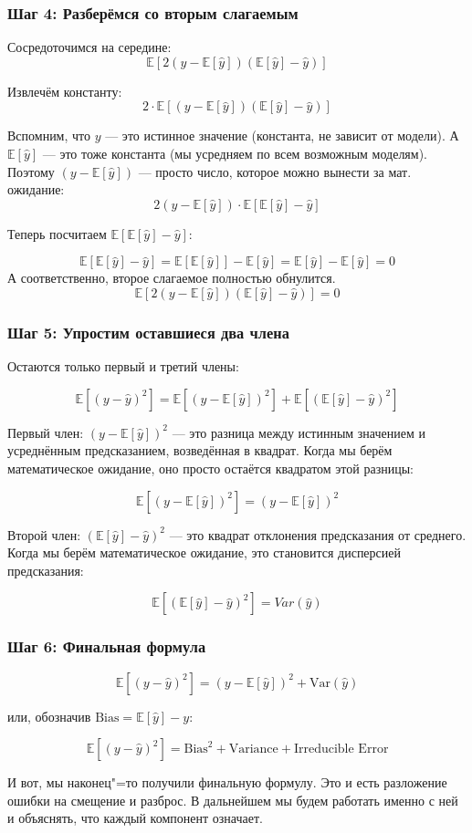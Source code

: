 \subsubsection*{Шаг 4: Разберёмся со вторым слагаемым}

Сосредоточимся на середине:
\[
\mathbb{E}[2(y - \mathbb{E}[\hat{y}])(\mathbb{E}[\hat{y}] - \hat{y})]
\]

Извлечём константу:
\[
2 \cdot \mathbb{E}[(y - \mathbb{E}[\hat{y}])(\mathbb{E}[\hat{y}] - \hat{y})]
\]

Вспомним, что $y$ --- это истинное значение (константа, не зависит от модели). А $\mathbb{E}[\hat{y}]$ --- это тоже константа (мы усредняем по всем возможным моделям). Поэтому $(y - \mathbb{E}[\hat{y}])$ --- просто число, которое можно вынести за мат. ожидание:
\[
2(y - \mathbb{E}[\hat{y}]) \cdot \mathbb{E}[\mathbb{E}[\hat{y}] - \hat{y}]
\]

Теперь посчитаем $\mathbb{E}[\mathbb{E}[\hat{y}] - \hat{y}]$:

\[
\mathbb{E}[\mathbb{E}[\hat{y}] - \hat{y}] = \mathbb{E}[\mathbb{E}[\hat{y}]] - \mathbb{E}[\hat{y}] = \mathbb{E}[\hat{y}] - \mathbb{E}[\hat{y}] = 0
\]
А соответственно, второе слагаемое полностью обнулится.
\[
\mathbb{E}[2(y - \mathbb{E}[\hat{y}])(\mathbb{E}[\hat{y}] - \hat{y})] = 0
\]

\subsubsection*{Шаг 5: Упростим оставшиеся два члена}

Остаются только первый и третий члены:

\[
\mathbb{E}[(y - \hat{y})^2] = \mathbb{E}[(y - \mathbb{E}[\hat{y}])^2] + \mathbb{E}[(\mathbb{E}[\hat{y}] - \hat{y})^2]
\]

Первый член: $(y - \mathbb{E}[\hat{y}])^2$ --- это разница между истинным значением и усреднённым предсказанием, возведённая в квадрат. Когда мы берём математическое ожидание, оно просто остаётся квадратом этой разницы:

\[
\mathbb{E}[(y - \mathbb{E}[\hat{y}])^2] = (y - \mathbb{E}[\hat{y}])^2
\]

Второй член: $(\mathbb{E}[\hat{y}] - \hat{y})^2$ --- это квадрат отклонения предсказания от среднего. Когда мы берём математическое ожидание, это становится дисперсией предсказания:

\[
\mathbb{E}[(\mathbb{E}[\hat{y}] - \hat{y})^2] = Var(\hat{y})
\]

\subsubsection*{Шаг 6: Финальная формула}

\[
\mathbb{E}[(y - \hat{y})^2] = (y - \mathbb{E}[\hat{y}])^2 + \text{Var}(\hat{y})
\]

или, обозначив $\text{Bias} = \mathbb{E}[\hat{y}] - y$:

\[
\mathbb{E}[(y - \hat{y})^2] = \text{Bias}^2 + \text{Variance} + \text{Irreducible Error}
\]

И вот, мы наконец"=то получили финальную формулу. Это и есть разложение ошибки на смещение и разброс. В дальнейшем мы будем работать именно с ней и объяснять, что каждый компонент означает.
